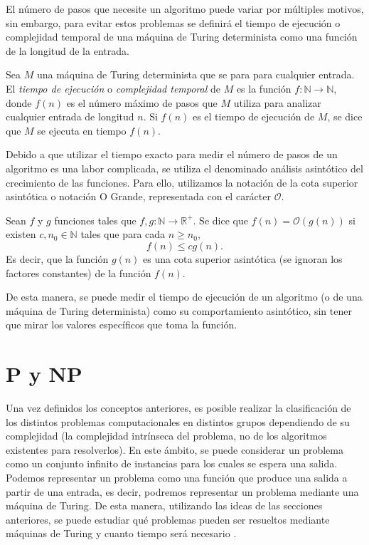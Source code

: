 El número de pasos que necesite un algoritmo puede variar por múltiples motivos, sin embargo, para evitar estos problemas se definirá el tiempo de ejecución o complejidad temporal de una máquina de Turing determinista como una función de la longitud de la entrada.

\begin{definition}
    Sea $M$ una máquina de Turing determinista que se para para cualquier entrada. El \textit{tiempo de ejecución} o \textit{complejidad temporal} de $M$ es la función $f:\mathbb{N}\rightarrow\mathbb{N}$, donde $f(n)$ es el número máximo de pasos que $M$ utiliza para analizar cualquier entrada de longitud $n$. Si $f(n)$ es el tiempo de ejecución de $M$, se dice que $M$ se ejecuta en tiempo $f(n)$.
\end{definition}

Debido a que utilizar el tiempo exacto para medir el número de pasos de un algoritmo es una labor complicada, se utiliza el denominado análisis asintótico del crecimiento de las funciones. Para ello, utilizamos la notación de la cota superior asintótica o notación O Grande, representada con el carácter $\mathcal{O}$. 

\begin{definition}
    Sean $f$ y $g$ funciones tales que $f,g:\mathbb{N}\rightarrow\mathbb{R}^+$. Se dice que $f(n)=\mathcal{O}(g(n))$ si existen $c,n_0\in \mathbb{N}$ tales que para cada $n\geq n_0$,
    $$f(n)\leq cg(n).$$
    Es decir, que la función $g(n)$ es una cota superior asintótica (se ignoran los factores constantes) de la función $f(n)$.
\end{definition}

De esta manera, se puede medir el tiempo de ejecución de un algoritmo (o de una máquina de Turing determinista) como su comportamiento asintótico, sin tener que mirar los valores específicos que toma la función.

\section{P y NP}
Una vez definidos los conceptos anteriores, es posible realizar la clasificación de los distintos problemas computacionales en distintos grupos dependiendo de su complejidad (la complejidad intrínseca del problema, no de los algoritmos existentes para resolverlos). En este ámbito, se puede considerar un problema como un conjunto infinito de instancias para los cuales se espera una salida. Podemos representar un problema como una función que produce una salida a partir de una entrada, es decir, podremos representar un problema mediante una máquina de Turing. De esta manera, utilizando las ideas de las secciones anteriores, se puede estudiar qué problemas pueden ser resueltos mediante máquinas de Turing y cuanto tiempo será necesario \cite{combarro-2023}.\\

